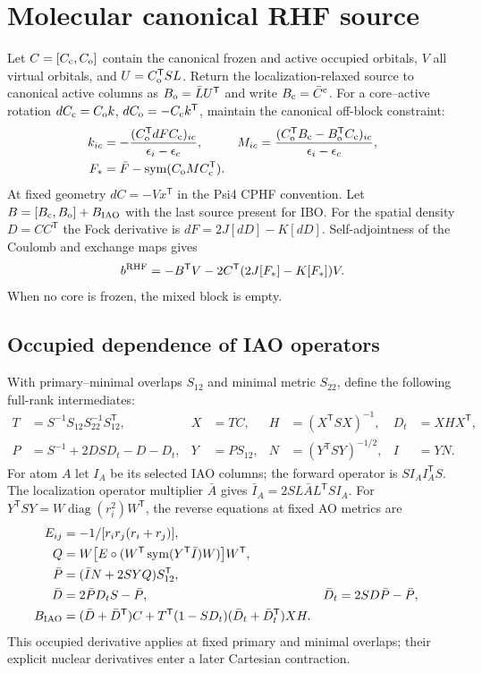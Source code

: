 \documentclass[11pt]{article}
\newcommand{\T}{^{\mathsf T}}
\newcommand{\sym}{\operatorname{sym}}
\begin{document}
\section{Molecular canonical RHF source}
Let $C=[C_{\rm c},C_{\rm o}]$ contain the canonical frozen and active
occupied orbitals, $V$ all virtual orbitals, and $U=C_{\rm o}\T SL$.
Return the localization-relaxed source to canonical active columns as
$B_{\rm o}=\bar L U\T$ and write $B_{\rm c}=\bar C^{\rm c}$.
For a core--active rotation $dC_{\rm c}=C_{\rm o}k$,
$dC_{\rm o}=-C_{\rm c}k\T$, maintain the canonical off-block constraint:
\begin{align}
 k_{ic}&=-\frac{(C_{\rm o}\T dF C_{\rm c})_{ic}}{\epsilon_i-\epsilon_c},&
 M_{ic}&=\frac{(C_{\rm o}\T B_{\rm c}-B_{\rm o}\T C_{\rm c})_{ic}}
 {\epsilon_i-\epsilon_c},\\
 F_*&=\bar F-\sym(C_{\rm o} M C_{\rm c}\T).
\end{align}
At fixed geometry $dC=-Vx\T$ in the Psi4 CPHF convention. Let
$B=[B_{\rm c},B_{\rm o}]+B_{\rm IAO}$ with the last source present for IBO.
For the spatial density $D=CC\T$ the Fock derivative is
$dF=2J[dD]-K[dD]$. Self-adjointness of the Coulomb and exchange maps gives
\begin{equation}
 b^{\rm RHF}=-B\T V-2C\T(2J[F_*]-K[F_*])V .
\end{equation}
When no core is frozen, the mixed block is empty.
\subsection{Occupied dependence of IAO operators}
With primary--minimal overlaps $S_{12}$ and minimal metric $S_{22}$,
define the following full-rank intermediates:
\begin{align}
 T&=S^{-1}S_{12}S_{22}^{-1}S_{12}\T,& X&=TC,&
 H&=(X\T S X)^{-1},& D_t&=XHX\T,\\
 P&=S^{-1}+2DSD_t-D-D_t,& Y&=PS_{12},&
 N&=(Y\T S Y)^{-1/2},& I&=YN.
\end{align}
For atom $A$ let $I_A$ be its selected IAO columns; the forward operator
is $S I_A I_A\T S$. The localization operator multiplier $\bar A$ gives
$\bar I_A=2SL\bar A L\T S I_A$. For $Y\T S Y=W\operatorname{diag}(r_i^2)W\T$,
the reverse equations at fixed AO metrics are
\begin{align}
 E_{ij}&=-1/[r_i r_j(r_i+r_j)],\\
 Q&=W\big[E\circ(W\T\sym(Y\T\bar I)W)\big]W\T,\\
 \bar P&=(\bar I N+2SYQ)S_{12}\T,\\
 \bar D&=2\bar P D_t S-\bar P,&
 \bar D_t&=2SD\bar P-\bar P,\\
 B_{\rm IAO}&=(\bar D+\bar D\T)C+
 T\T(1-SD_t)(\bar D_t+\bar D_t\T)XH .
\end{align}
This occupied derivative applies at fixed primary and minimal overlaps;
their explicit nuclear derivatives enter a later Cartesian contraction.
\end{document}
